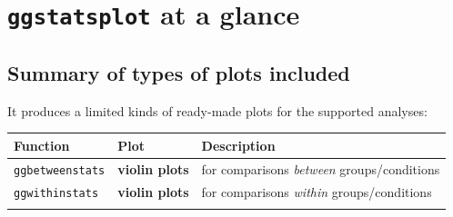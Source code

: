 \documentclass[]{article}
\begin{document}
\hypertarget{ggstatsplot-at-a-glance}{%
\section{\texorpdfstring{\texttt{ggstatsplot} at a glance}{ggstatsplot at a glance}}\label{ggstatsplot-at-a-glance}}

\hypertarget{summary-of-types-of-plots-included}{%
\subsection{Summary of types of plots included}\label{summary-of-types-of-plots-included}}

It produces a limited kinds of ready-made plots for the supported analyses:

\begin{longtable}[]{@{}lll@{}}
\toprule
\begin{minipage}[b]{0.17\columnwidth}\raggedright
Function\strut
\end{minipage} & \begin{minipage}[b]{0.25\columnwidth}\raggedright
Plot\strut
\end{minipage} & \begin{minipage}[b]{0.49\columnwidth}\raggedright
Description\strut
\end{minipage}\tabularnewline
\midrule
\endhead
\begin{minipage}[t]{0.17\columnwidth}\raggedright
\texttt{ggbetweenstats}\strut
\end{minipage} & \begin{minipage}[t]{0.25\columnwidth}\raggedright
\textbf{violin plots}\strut
\end{minipage} & \begin{minipage}[t]{0.49\columnwidth}\raggedright
for comparisons \emph{between} groups/conditions\strut
\end{minipage}\tabularnewline
\begin{minipage}[t]{0.17\columnwidth}\raggedright
\texttt{ggwithinstats}\strut
\end{minipage} & \begin{minipage}[t]{0.25\columnwidth}\raggedright
\textbf{violin plots}\strut
\end{minipage} & \begin{minipage}[t]{0.49\columnwidth}\raggedright
for comparisons \emph{within} groups/conditions\strut
\end{minipage}\tabularnewline
\begin{minipage}[t]{0.17\columnwidth}\raggedright

\end{minipage}
\end{longtable}
\end{document}
